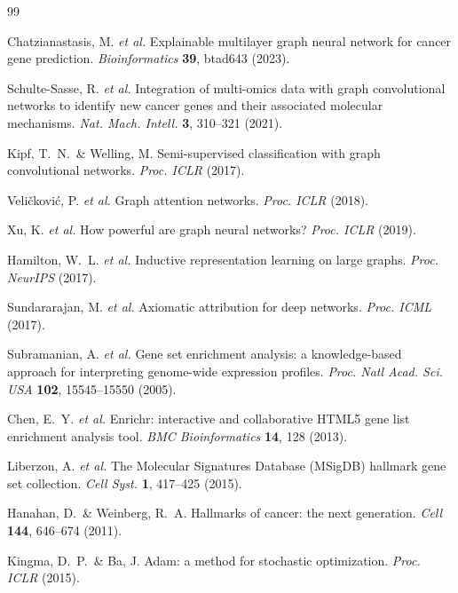 
\begin{thebibliography}{99}

Chatzianastasis, M. \textit{et al.}
Explainable multilayer graph neural network for cancer gene prediction.
\textit{Bioinformatics} \textbf{39}, btad643 (2023).

Schulte-Sasse, R. \textit{et al.}
Integration of multi-omics data with graph convolutional networks to identify
new cancer genes and their associated molecular mechanisms.
\textit{Nat. Mach. Intell.} \textbf{3}, 310--321 (2021).

Kipf, T.\ N.\ \& Welling, M.
Semi-supervised classification with graph convolutional networks.
\textit{Proc. ICLR} (2017).

Veli\v{c}kovi\'{c}, P. \textit{et al.}
Graph attention networks.
\textit{Proc. ICLR} (2018).

Xu, K. \textit{et al.}
How powerful are graph neural networks?
\textit{Proc. ICLR} (2019).

Hamilton, W.\ L. \textit{et al.}
Inductive representation learning on large graphs.
\textit{Proc. NeurIPS} (2017).

Sundararajan, M. \textit{et al.}
Axiomatic attribution for deep networks.
\textit{Proc. ICML} (2017).

Subramanian, A. \textit{et al.}
Gene set enrichment analysis: a knowledge-based approach for interpreting
genome-wide expression profiles.
\textit{Proc. Natl Acad. Sci. USA} \textbf{102}, 15545--15550 (2005).

Chen, E.\ Y. \textit{et al.}
Enrichr: interactive and collaborative HTML5 gene list enrichment analysis tool.
\textit{BMC Bioinformatics} \textbf{14}, 128 (2013).

Liberzon, A. \textit{et al.}
The Molecular Signatures Database (MSigDB) hallmark gene set collection.
\textit{Cell Syst.} \textbf{1}, 417--425 (2015).

Hanahan, D.\ \& Weinberg, R.\ A.
Hallmarks of cancer: the next generation.
\textit{Cell} \textbf{144}, 646--674 (2011).

Kingma, D.\ P.\ \& Ba, J.
Adam: a method for stochastic optimization.
\textit{Proc. ICLR} (2015).


\end{thebibliography}
